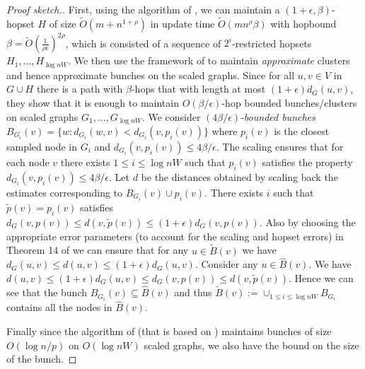 \lmbunch*
\begin{proof}[Proof sketch.]
First, using the algorithm of \cite{LN2020}, we can maintain a $(1+\epsilon, \beta)$-hopset $H$ of size $\tilde{O}(m+n^{1+\rho})$ in update time $\tilde{O}(mn^{\rho} \beta)$ with hopbound $\beta =\tilde{O}(\frac{1}{\rho\epsilon})^{2\rho}$, which is consisted of a sequence of $2^i$-restricted hopsets $H_1,...,H_{\log nW}$. We then use the framework of \cite{LN2020} to maintain \textit{approximate} clusters and hence approximate bunches on the scaled graphs. Since for all $u,v \in V$ in $G \cup H$ there is a path with $\beta$-hops that with length at most $(1+\epsilon)d_G(u,v)$, they show that it is enough to maintain $O(\beta/\epsilon)$-hop bounded bunches/clusters on scaled graphs $G_1,...,G_{\log n W}$. We consider $(4\beta/\epsilon)$-\textit{bounded bunches} $B_{G_i}(v)= \{ w: d_{G_i}(w,v) < d_{G_i}(v, p_i(v))\}$ where $p_i(v)$ is the closest sampled node in $G_i$ and $d_{G_i}(v, p_i(v)) \leq 4\beta/\epsilon$. The scaling ensures that for each node $v$ there exists $1 \leq i \leq \log nW$ such that $p_i(v)$ satisfies the property $d_{G_i}(v, p_i(v)) \leq 4\beta/\epsilon$. Let $d$ be the distances obtained by scaling back the estimates corresponding to $B_{G_i}(v) \cup p_i(v)$. There exists $i$ such that  $\tilde{p}(v) =p_i(v)$ satisfies $d_G(v,p(v)) \leq d(v,\tilde{p}(v)) \leq (1+\epsilon) d_G(v,p(v))$. Also by choosing the appropriate error parameters (to account for the scaling and hopset errors) in Theorem 14 of \cite{LN2020} we can ensure that for any $u \in \tilde{B}(v)$ we have $d_G(u,v) \leq d(u,v) \leq (1+\epsilon) d_G(u,v)$.
Consider any $u \in \hat{B}(v)$. We have $d(u,v) \leq (1+\epsilon)d_G(u,v) \leq d_G(v,p(v)) \leq d(v, \tilde{p}(v))$.
Hence we can see that the bunch $B_{G_i}(v) \subseteq \hat{B}(v)$ and thus $\tilde{B}(v):=\cup_{1 \leq i \leq \log nW} B_{G_i}$ contains all the nodes in $\hat{B}(v)$.

Finally since the algorithm of \cite{LN2020} (that is based on \cite{RZ12}) maintains bunches of size $O(\log n/p)$ on $O(\log nW)$ scaled graphs, we also have the bound on the size of the bunch.
\end{proof}









